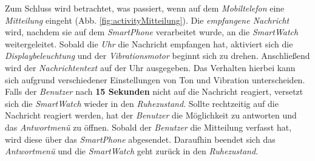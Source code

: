 Zum Schluss wird betrachtet, was passiert, wenn auf dem \textit{Mobiltelefon} eine \textit{Mitteilung} eingeht (Abb. \ref{fig:activityMitteilung}). Die \textit{empfangene Nachricht} wird, nachdem sie auf dem \textit{SmartPhone} verarbeitet wurde, an die \textit{SmartWatch} weitergeleitet. Sobald die \textit{Uhr} die Nachricht empfangen hat, aktiviert sich die \textit{Displaybeleuchtung} und der \textit{Vibrationsmotor} beginnt sich zu drehen. Anschließend wird der \textit{Nachrichtentext} auf der Uhr ausgegeben. Das Verhalten hierbei kann sich aufgrund verschiedener Einstellungen von Ton und Vibration unterscheiden. Falls der \textit{Benutzer} nach \textbf{15 Sekunden} nicht auf die Nachricht reagiert, versetzt sich die \textit{SmartWatch} wieder in den \textit{Ruhezustand}. Sollte rechtzeitig auf die Nachricht reagiert werden, hat der \textit{Benutzer} die Möglichkeit zu antworten und das \textit{Antwortmenü} zu öffnen. Sobald der \textit{Benutzer} die Mitteilung verfasst hat, wird diese über das \textit{SmartPhone} abgesendet. Daraufhin beendet sich das \textit{Antwortmenü} und die \textit{SmartWatch} geht zurück in den \textit{Ruhezustand}.
